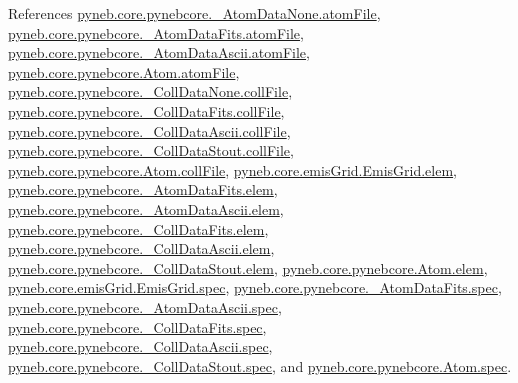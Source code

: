 References \hyperlink{pynebcore_8py_source_l00060}{pyneb.\-core.\-pynebcore.\-\_\-\-Atom\-Data\-None.\-atom\-File}, \hyperlink{pynebcore_8py_source_l00112}{pyneb.\-core.\-pynebcore.\-\_\-\-Atom\-Data\-Fits.\-atom\-File}, \hyperlink{pynebcore_8py_source_l00325}{pyneb.\-core.\-pynebcore.\-\_\-\-Atom\-Data\-Ascii.\-atom\-File}, \hyperlink{pynebcore_8py_source_l01250}{pyneb.\-core.\-pynebcore.\-Atom.\-atom\-File}, \hyperlink{pynebcore_8py_source_l00076}{pyneb.\-core.\-pynebcore.\-\_\-\-Coll\-Data\-None.\-coll\-File}, \hyperlink{pynebcore_8py_source_l00615}{pyneb.\-core.\-pynebcore.\-\_\-\-Coll\-Data\-Fits.\-coll\-File}, \hyperlink{pynebcore_8py_source_l00967}{pyneb.\-core.\-pynebcore.\-\_\-\-Coll\-Data\-Ascii.\-coll\-File}, \hyperlink{pynebcore_8py_source_l01182}{pyneb.\-core.\-pynebcore.\-\_\-\-Coll\-Data\-Stout.\-coll\-File}, \hyperlink{pynebcore_8py_source_l01285}{pyneb.\-core.\-pynebcore.\-Atom.\-coll\-File}, \hyperlink{emis_grid_8py_source_l00048}{pyneb.\-core.\-emis\-Grid.\-Emis\-Grid.\-elem}, \hyperlink{pynebcore_8py_source_l00090}{pyneb.\-core.\-pynebcore.\-\_\-\-Atom\-Data\-Fits.\-elem}, \hyperlink{pynebcore_8py_source_l00311}{pyneb.\-core.\-pynebcore.\-\_\-\-Atom\-Data\-Ascii.\-elem}, \hyperlink{pynebcore_8py_source_l00577}{pyneb.\-core.\-pynebcore.\-\_\-\-Coll\-Data\-Fits.\-elem}, \hyperlink{pynebcore_8py_source_l00927}{pyneb.\-core.\-pynebcore.\-\_\-\-Coll\-Data\-Ascii.\-elem}, \hyperlink{pynebcore_8py_source_l01163}{pyneb.\-core.\-pynebcore.\-\_\-\-Coll\-Data\-Stout.\-elem}, \hyperlink{pynebcore_8py_source_l01219}{pyneb.\-core.\-pynebcore.\-Atom.\-elem}, \hyperlink{emis_grid_8py_source_l00049}{pyneb.\-core.\-emis\-Grid.\-Emis\-Grid.\-spec}, \hyperlink{pynebcore_8py_source_l00091}{pyneb.\-core.\-pynebcore.\-\_\-\-Atom\-Data\-Fits.\-spec}, \hyperlink{pynebcore_8py_source_l00312}{pyneb.\-core.\-pynebcore.\-\_\-\-Atom\-Data\-Ascii.\-spec}, \hyperlink{pynebcore_8py_source_l00578}{pyneb.\-core.\-pynebcore.\-\_\-\-Coll\-Data\-Fits.\-spec}, \hyperlink{pynebcore_8py_source_l00928}{pyneb.\-core.\-pynebcore.\-\_\-\-Coll\-Data\-Ascii.\-spec}, \hyperlink{pynebcore_8py_source_l01164}{pyneb.\-core.\-pynebcore.\-\_\-\-Coll\-Data\-Stout.\-spec}, and \hyperlink{pynebcore_8py_source_l01220}{pyneb.\-core.\-pynebcore.\-Atom.\-spec}.


